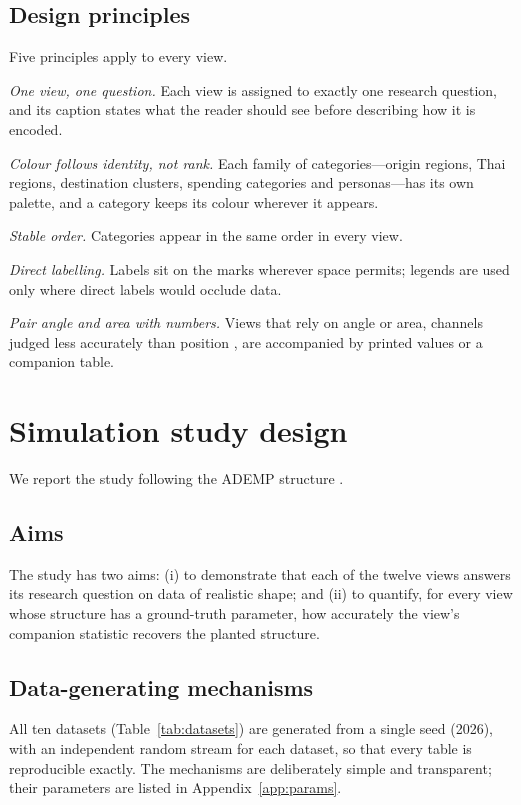 \documentclass{article}
\begin{document}
\subsection{Design principles}
Five principles apply to every view.
\begin{description}[leftmargin=2.2em,labelwidth=1.8em,itemsep=2pt]
  \item[D1] \emph{One view, one question.} Each view is assigned to exactly one research question, and its
        caption states what the reader should see before describing how it is encoded.
  \item[D2] \emph{Colour follows identity, not rank.} Each family of categories---origin regions, Thai regions,
        destination clusters, spending categories and personas---has its own palette, and a category keeps its
        colour wherever it appears.
  \item[D3] \emph{Stable order.} Categories appear in the same order in every view.
  \item[D4] \emph{Direct labelling.} Labels sit on the marks wherever space permits; legends are used only where
        direct labels would occlude data.
  \item[D5] \emph{Pair angle and area with numbers.} Views that rely on angle or area, channels judged less
        accurately than position \citep{cleveland1984}, are accompanied by printed values or a companion table.
\end{description}

\section{Simulation study design}\label{sec:study}

We report the study following the ADEMP structure \citep{morris2019}.

\subsection{Aims}
The study has two aims: (i) to demonstrate that each of the twelve views answers its research question on data
of realistic shape; and (ii) to quantify, for every view whose structure has a ground-truth parameter, how
accurately the view's companion statistic recovers the planted structure.

\subsection{Data-generating mechanisms}\label{sec:dgm}
All ten datasets (Table~\ref{tab:datasets}) are generated from a single seed (2026), with an independent random
stream for each dataset, so that every table is reproducible exactly. The mechanisms are deliberately simple
and transparent; their parameters are listed in Appendix~\ref{app:params}.
\end{document}
